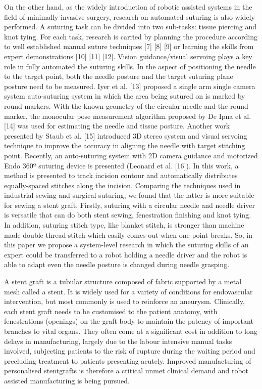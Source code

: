 On the other hand, as the widely introduction of robotic assisted systems in the field of minimally invasive surgery, research on automated suturing is also widely performed. A suturing task can be divided into two sub-tasks: tissue piercing and knot tying. For each task, research is carried by planning the procedure according to well established manual suture techniques [7] [8] [9] or learning the skills from expert demonstrations [10] [11] [12]. Vision guidance/visual servoing plays a key role in fully automated the suturing skills. In the aspect of positioning the needle to the target point, both the needle posture and the target suturing plane posture need to be measured. Iyer et al. [13] proposed a single arm single camera system auto-suturing system in which the area being sutured on is marked by round markers. With the known geometry of the circular needle and the round marker, the monocular pose measurement algorithm proposed by De Ipna et al. [14] was used for estimating the needle and tissue posture. Another work presented by Staub et al. [15] introduced 3D stereo system and visual servoing technique to improve the accuracy in aligning the needle with target stitching point. Recently, an auto-suturing system with 2D camera guidance and motorized Endo 360º suturing device is presented (Leonard et al. [16]). In this work, a method is presented to track incision contour and automatically distributes equally-spaced stitches along the incision.
Comparing the techniques used in industrial sewing and surgical suturing, we found that the latter is more suitable for sewing a stent graft. Firstly, suturing with a circular needle and needle driver is versatile that can do both stent sewing, fenestration finishing and knot tying. In addition, suturing stitch type, like blanket stitch, is stronger than machine made double-thread stitch which easily comes out when one point breaks. So, in this paper we propose a system-level research in which the suturing skills of an expert could be transferred to a robot holding a needle driver and the robot is able to adapt even the needle posture is changed during needle grasping.




A stent graft is a tubular structure composed of fabric supported by a metal mesh called a stent. It is widely used for a variety of conditions for endovascular intervention, but most commonly is used to reinforce an aneurysm.
Clinically, each stent graft needs to be customised to the patient anatomy, with fenestrations (openings) on the graft body to maintain the patency of important branches to vital organs. They often come at a significant cost in addition to long delays in manufacturing, largely due to the labour intensive manual tasks involved, subjecting patients to the risk of rupture during the waiting period and precluding treatment to patients presenting acutely. Improved manufacturing of personalised stentgrafts is therefore a critical unmet clinical demand and robot assisted manufacturing is being pursued.

